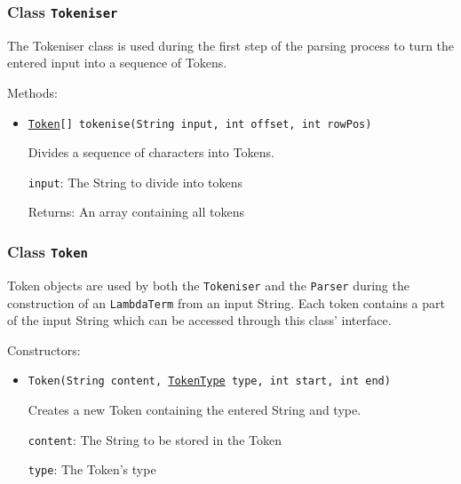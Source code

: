 \subsubsection{Class \texttt{Tokeniser}}
\label{type:edu.kit.wavelength.client.model.term.parsing.Tokeniser}
The Tokeniser class is used during the first step of the parsing process to
 turn the entered input into a sequence of Tokens.

Methods:
\begin{itemize}
\item \texttt{\hyperref[type:edu.kit.wavelength.client.model.term.parsing.Token]{Token}[] tokenise(String input, int offset, int rowPos)}

Divides a sequence of characters into Tokens.

\texttt{input}: The String to divide into tokens

Returns: An array containing all tokens

\end{itemize}

\subsubsection{Class \texttt{Token}}
\label{type:edu.kit.wavelength.client.model.term.parsing.Token}
Token objects are used by both the \texttt{Tokeniser} and the \texttt{Parser}
 during the construction of an \texttt{LambdaTerm} from an input String. Each
 token contains a part of the input String which can be accessed through this
 class' interface.

Constructors:
\begin{itemize}
\item \texttt{Token(String content, \hyperref[type:edu.kit.wavelength.client.model.term.parsing.TokenType]{TokenType} type, int start, int end)}

Creates a new Token containing the entered String and type.

\texttt{content}: The String to be stored in the Token

\texttt{type}: The Token's type

\end{itemize}

